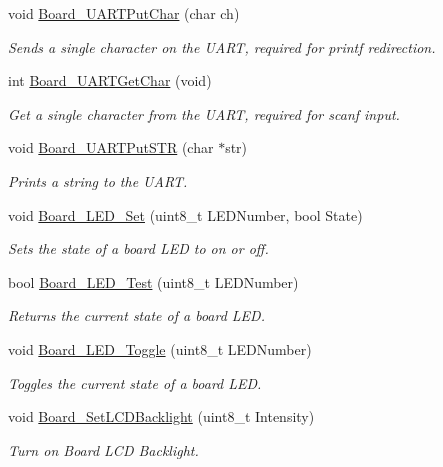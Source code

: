 \begin{DoxyCompactItemize}
void \hyperlink{group___b_o_a_r_d___c_o_m_m_o_n___a_p_i_gada2a79f4fcd7cd730317fc34291bf08e}{Board\+\_\+\+U\+A\+R\+T\+Put\+Char} (char ch)
\begin{DoxyCompactList}\small\item\em Sends a single character on the U\+A\+R\+T, required for printf redirection. \end{DoxyCompactList}\item 
int \hyperlink{group___b_o_a_r_d___c_o_m_m_o_n___a_p_i_ga4cffd2ff35f970b7dfad4fdf6419ecf6}{Board\+\_\+\+U\+A\+R\+T\+Get\+Char} (void)
\begin{DoxyCompactList}\small\item\em Get a single character from the U\+A\+R\+T, required for scanf input. \end{DoxyCompactList}\item 
void \hyperlink{group___b_o_a_r_d___c_o_m_m_o_n___a_p_i_ga26211607542af1bb2a867d6641a8d4f3}{Board\+\_\+\+U\+A\+R\+T\+Put\+S\+T\+R} (char $\ast$str)
\begin{DoxyCompactList}\small\item\em Prints a string to the U\+A\+R\+T. \end{DoxyCompactList}\item 
void \hyperlink{group___b_o_a_r_d___c_o_m_m_o_n___a_p_i_ga4beb63d516764b260e9798642fab0047}{Board\+\_\+\+L\+E\+D\+\_\+\+Set} (uint8\+\_\+t L\+E\+D\+Number, bool State)
\begin{DoxyCompactList}\small\item\em Sets the state of a board L\+E\+D to on or off. \end{DoxyCompactList}\item 
bool \hyperlink{group___b_o_a_r_d___c_o_m_m_o_n___a_p_i_ga8e79f51947703de384c34bc86908bd9e}{Board\+\_\+\+L\+E\+D\+\_\+\+Test} (uint8\+\_\+t L\+E\+D\+Number)
\begin{DoxyCompactList}\small\item\em Returns the current state of a board L\+E\+D. \end{DoxyCompactList}\item 
void \hyperlink{group___b_o_a_r_d___c_o_m_m_o_n___a_p_i_ga39c663f67913226d0f29e11c0d0fd523}{Board\+\_\+\+L\+E\+D\+\_\+\+Toggle} (uint8\+\_\+t L\+E\+D\+Number)
\begin{DoxyCompactList}\small\item\em Toggles the current state of a board L\+E\+D. \end{DoxyCompactList}\item 
void \hyperlink{group___b_o_a_r_d___c_o_m_m_o_n___a_p_i_ga56f5c2aa9b42d140429abdd9d3f629c8}{Board\+\_\+\+Set\+L\+C\+D\+Backlight} (uint8\+\_\+t Intensity)
\begin{DoxyCompactList}\small\item\em Turn on Board L\+C\+D Backlight. \end{DoxyCompactList}\end{DoxyCompactItemize}



